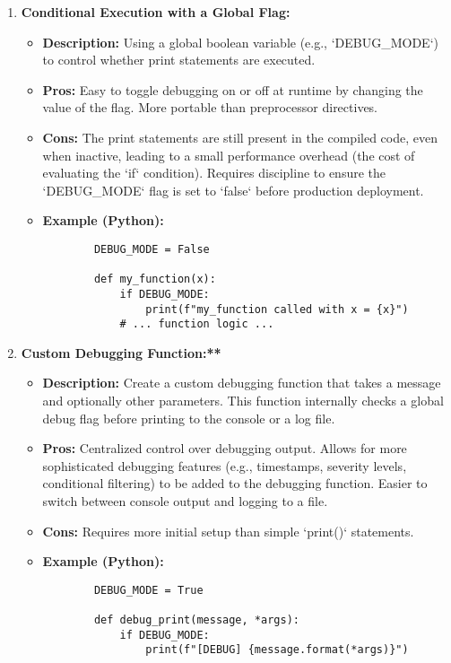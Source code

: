 \documentclass{article}
\begin{document}
{{{\begin{enumerate}
    \item \textbf{Conditional Execution with a Global Flag:}
    \begin{itemize}
        \item \textbf{Description:} Using a global boolean variable (e.g., `DEBUG_MODE`) to control whether print statements are executed.
        \item \textbf{Pros:} Easy to toggle debugging on or off at runtime by changing the value of the flag. More portable than preprocessor directives.
        \item \textbf{Cons:}  The print statements are still present in the compiled code, even when inactive, leading to a small performance overhead (the cost of evaluating the `if` condition). Requires discipline to ensure the `DEBUG_MODE` flag is set to `false` before production deployment.
        \item \textbf{Example (Python):}
        \begin{verbatim}
        DEBUG_MODE = False

        def my_function(x):
            if DEBUG_MODE:
                print(f"my_function called with x = {x}")
            # ... function logic ...
        \end{verbatim}
    \end{itemize}

    \item \textbf{Custom Debugging Function:**}
    \begin{itemize}
        \item \textbf{Description:} Create a custom debugging function that takes a message and optionally other parameters.  This function internally checks a global debug flag before printing to the console or a log file.
        \item \textbf{Pros:} Centralized control over debugging output.  Allows for more sophisticated debugging features (e.g., timestamps, severity levels, conditional filtering) to be added to the debugging function. Easier to switch between console output and logging to a file.
        \item \textbf{Cons:}  Requires more initial setup than simple `print()` statements.
        \item \textbf{Example (Python):}
        \begin{verbatim}
        DEBUG_MODE = True

        def debug_print(message, *args):
            if DEBUG_MODE:
                print(f"[DEBUG] {message.format(*args)}")


\end{verbatim}
\end{itemize}
\end{enumerate}}}}
\end{document}
